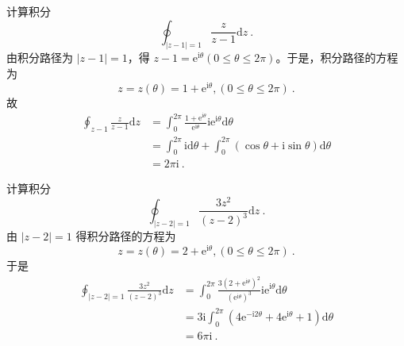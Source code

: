 \begin{example}{}
计算积分
\begin{equation}
\oint_{|z-1|=1} \frac{z}{z-1} \mathrm{d} z~.
\end{equation}
由积分路径为 $|z -1|=1$，得 $z-1=\mathrm{e}^{\mathrm{i} \theta}(0 \leqslant \theta \leqslant 2 \pi)$。于是，积分路径的方程为
\begin{equation}
z=z(\theta)=1+\mathrm{e}^{\mathrm{i} \theta},(0 \leqslant \theta \leqslant 2 \pi)~.
\end{equation}
故
\begin{equation}
\begin{aligned} \oint_{z-1} \frac{z}{z-1} \mathrm{d} z &=\int_{0}^{2 \pi} \frac{1+\mathrm{e}^{\mathrm{i} \theta}}{\mathrm{e}^{\mathrm{i} \theta}} \mathrm{ie}^{\mathrm{i} \theta} \mathrm{d} \theta \\ &=\int_{0}^{2 \pi} \mathrm{id} \theta+\int_{0}^{2 \pi}(\cos \theta+\mathrm{i} \sin \theta) \mathrm{d} \theta \\ &=2 \pi \mathrm{i} ~.\end{aligned}
\end{equation}
\end{example}

\begin{example}{}
计算积分
\begin{equation}
\oint_{|z-2|=1} \frac{3 z^{2}}{(z-2)^{3}} \mathrm{d} z~.
\end{equation}
由 $ |z - 2| =1$ 得积分路径的方程为
\begin{equation}
z=z(\theta)=2+\mathrm{e}^{\mathrm{i} \theta},(0 \leqslant \theta \leqslant 2 \pi)~.
\end{equation}
于是
\begin{equation}
\begin{aligned} \oint_{|z-2|=1} \frac{3 z^{2}}{(z-2)^{3}} \mathrm{d} z &=\int_{0}^{2 \pi} \frac{3\left(2+\mathrm{e}^{\mathrm{i} \theta}\right)^{2}}{\left(\mathrm{e}^{\mathrm{i} \theta}\right)^{3}} \mathrm{ie}^{\mathrm{i} \theta} \mathrm{d} \theta \\ &=3 \mathrm{i} \int_{0}^{2 \pi}\left(4 \mathrm{e}^{-\mathrm{i} 2 \theta}+4 \mathrm{e}^{\mathrm{i} \theta}+1\right) \mathrm{d} \theta \\ &=6 \pi \mathrm{i}~. \end{aligned}
\end{equation}
\end{example}
